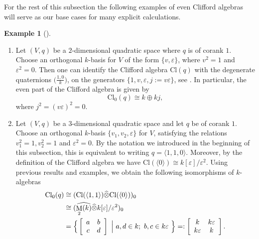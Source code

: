 \documentclass[a4paper, twoside, 11pt]{amsart}
\theoremstyle{definition}
\newtheorem{example}[theorem]{Example}
\theoremstyle{remark}
\numberwithin{equation}{theorem}
\DeclareMathOperator{\matri}{M}
\newcommand{\evencl}{\mathrm{Cl}_0}
\newcommand{\cl}{\mathrm{Cl}}
\begin{document}
For the rest of this subsection the following examples of even Clifford algebras will serve as our base cases for many explicit calculations. 
\begin{example}[{\cite[Ch.\ 4, Example 1.5]{Lam_quadratic}}]\label{example_intro}
    \begin{enumerate}[label=\roman*)]
        \item Let $(V,q)$ be a $2$-dimensional quadratic space where $q$ is of corank $1$. Choose an orthogonal $k$-basis for $V$ of the form $\{v, \varepsilon \}$, where $v^2 =1$ and $\varepsilon^2 =0$. Then one can identify the Clifford algebra $\cl(q)$ with the degenerate quaternions $\big(\frac{1,0}{k}\big)$, on the generators $\{1,v,\varepsilon, j := v\varepsilon \}$, see \cite[Ch.\ IV§1]{Lam_quadratic}. In particular, the even part of the Clifford algebra is given by 
        \begin{equation*}
            \evencl(q) \cong k \oplus kj, 
        \end{equation*}
        where $j^2 = (v\varepsilon)^2 = 0$.
        \item Let $(V,q)$ be a $3$-dimensional quadratic space and let $q$ be of corank $1$. Choose an orthogonal $k$-basis $\{v_1,v_2,\varepsilon\}$ for $V$, satisfying the relations $v_1^2=1, v_2^2=1$ and $\varepsilon^2 =0$. By the notation we introduced in the beginning of this subsection, this is equivalent to writing $q= \langle 1,1,0\rangle$. Moreover, by the definition of the Clifford algebra we have $\cl(\langle 0\rangle) \cong k[\varepsilon]/\varepsilon^2$. Using previous results and examples, we obtain the following isomorphisms of $k$-algebras
        \begin{equation*}
        \begin{aligned}
            \evencl(q) & \cong (\cl(\langle 1,1\rangle) \widehat{\otimes}\cl(\langle 0 \rangle))_0 \\
            & \cong (\widehat{\matri_2(k)} \widehat{\otimes} k[\varepsilon]/\varepsilon^2)_0 \\
            & = \Big{\{} \left[ {\begin{array}{cc}
            a & b \\
            c & d \\
        \end{array} } \right] \ \Big{|} \ a,d \in k; \ b,c \in k\varepsilon \  \Big{\}} =: \left[ {\begin{array}{cc}
            k & k\varepsilon \\
            k\varepsilon & k \\
        \end{array} } \right].\\
        \end{aligned}
        \end{equation*}
    \end{enumerate}
\end{example} 
\end{document}
